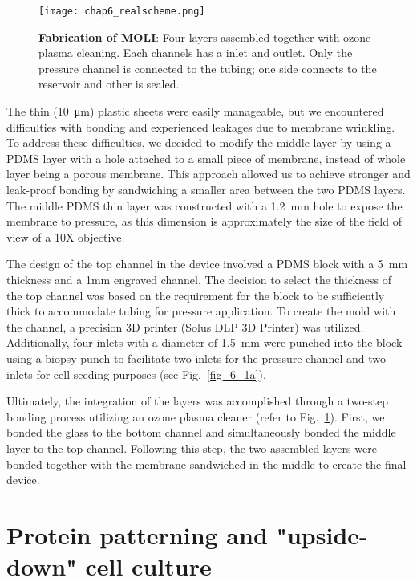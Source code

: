 \begin{figure}[h!]
	\centering
	\texttt{[image: chap6\_realscheme.png]}
	\caption{ \textbf{Fabrication of MOLI}: Four layers assembled together with ozone plasma cleaning. Each channels has a inlet and outlet. Only the pressure channel is connected to the tubing; one side connects to the reservoir and other is sealed. 
	}\label{fig_6_2}
\end{figure}

\clearpage

The thin (10~\unit{\um}) plastic sheets were easily manageable, but we encountered difficulties with bonding and experienced leakages due to membrane wrinkling. To address these difficulties, we decided to modify the middle layer by using a PDMS layer with a hole attached to a small piece of membrane, instead of whole layer being a porous membrane. This approach allowed us to achieve stronger and leak-proof bonding by sandwiching a smaller area between the two PDMS layers. The middle PDMS thin layer was constructed with a 1.2~\unit{\mm} hole to expose the membrane to pressure, as this dimension is approximately the size of the field of view of a 10X objective.

The design of the top channel in the device involved a PDMS block with a 5~\unit{\mm} thickness and a 1mm engraved channel. The decision to select the thickness of the top channel was based on the requirement for the block to be sufficiently thick to accommodate tubing for pressure application.  To create the mold with the channel, a precision 3D printer (Solus DLP 3D Printer) was utilized. Additionally, four inlets with a diameter of 1.5~\unit{\mm} were punched into the block using a biopsy punch to facilitate two inlets for the pressure channel and two inlets for cell seeding purposes  (see Fig.~\ref{fig_6_1a}).

Ultimately, the integration of the layers was accomplished through a two-step bonding process utilizing an ozone plasma cleaner (refer to Fig.~\ref{fig_6_2}). First, we bonded the glass to the bottom channel and simultaneously bonded the middle layer to the top channel. Following this step, the two assembled layers were bonded together with the membrane sandwiched in the middle to create the final device.
\vspace{-0.05cm}
\hypertarget{protein-patterning-and-inverted-cell-culture}{%
\section{Protein patterning and "upside-down" cell
culture}\label{protein-patterning-and-inverted-cell-culture}}

